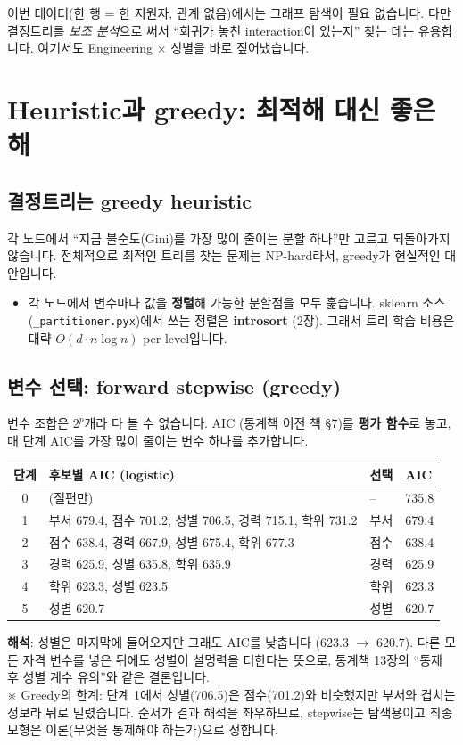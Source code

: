 \documentclass[11pt,a4paper]{article}
\newcommand{\code}[1]{\texttt{#1}}
\newcommand{\aside}[1]{{\footnotesize\color{black!65}#1}}
\begin{document}
\begin{dtbox}
이번 데이터(한 행 = 한 지원자, 관계 없음)에서는 그래프 탐색이 필요 없습니다. 다만 결정트리를 \emph{보조 분석}으로 써서 ``회귀가 놓친 interaction이 있는지'' 찾는 데는 유용합니다. 여기서도 Engineering $\times$ 성별을 바로 짚어냈습니다.
\end{dtbox}

\section{Heuristic과 greedy: 최적해 대신 좋은 해}

\subsection{결정트리는 greedy heuristic}
각 노드에서 ``지금 불순도(Gini)를 가장 많이 줄이는 분할 하나''만 고르고 되돌아가지 않습니다. 전체적으로 최적인 트리를 찾는 문제는 NP-hard라서, greedy가 현실적인 대안입니다.
\begin{itemize}
\item 각 노드에서 변수마다 값을 \textbf{정렬}해 가능한 분할점을 모두 훑습니다. sklearn 소스(\code{\_partitioner.pyx})에서 쓰는 정렬은 \textbf{introsort} (2장). 그래서 트리 학습 비용은 대략 $O(d\cdot n\log n)$ per level입니다.
\end{itemize}

\subsection{변수 선택: forward stepwise (greedy)}
변수 조합은 $2^p$개라 다 볼 수 없습니다. AIC (통계책 이전 책 §7)를 \textbf{평가 함수}로 놓고, 매 단계 AIC를 가장 많이 줄이는 변수 하나를 추가합니다.
\begin{center}\small
\begin{tabular}{@{}c l l l@{}}
\toprule
단계 & 후보별 AIC (logistic) & 선택 & AIC \\
\midrule
0 & (절편만) & -- & 735.8 \\
1 & 부서 679.4, 점수 701.2, 성별 706.5, 경력 715.1, 학위 731.2 & 부서 & 679.4 \\
2 & 점수 638.4, 경력 667.9, 성별 675.4, 학위 677.3 & 점수 & 638.4 \\
3 & 경력 625.9, 성별 635.8, 학위 635.9 & 경력 & 625.9 \\
4 & 학위 623.3, 성별 623.5 & 학위 & 623.3 \\
5 & 성별 620.7 & 성별 & 620.7 \\
\bottomrule
\end{tabular}
\end{center}
\textbf{해석}: 성별은 마지막에 들어오지만 그래도 AIC를 낮춥니다 (623.3 $\to$ 620.7). 다른 모든 자격 변수를 넣은 뒤에도 성별이 설명력을 더한다는 뜻으로, 통계책 13장의 ``통제 후 성별 계수 유의''와 같은 결론입니다.\\
\aside{※ Greedy의 한계: 단계 1에서 성별(706.5)은 점수(701.2)와 비슷했지만 부서와 겹치는 정보라 뒤로 밀렸습니다. 순서가 결과 해석을 좌우하므로, stepwise는 탐색용이고 최종 모형은 이론(무엇을 통제해야 하는가)으로 정합니다.}
\end{document}
